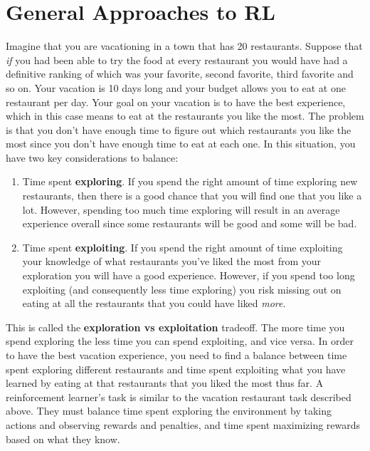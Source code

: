 \section{General Approaches to RL}
Imagine that you are vacationing in a town that has 20 restaurants. Suppose that \textit{if} you had been able to try the food at every restaurant you would have had a definitive ranking of which was your favorite, second favorite, third favorite and so on. Your vacation is 10 days long and your budget allows you to eat at one restaurant per day. Your goal on your vacation is to have the best experience, which in this case means to eat at the restaurants you like the most. The problem is that you don't have enough time to figure out which restaurants you like the most since you don't have enough time to eat at each one. In this situation, you have two key considerations to balance:
\begin{enumerate}
    \item Time spent \textbf{exploring}. If you spend the right amount of time exploring new restaurants, then there is a good chance that you will find one that you like a lot. However, spending too much time exploring will result in an average experience overall since some restaurants will be good and some will be bad.
    \item Time spent \textbf{exploiting}. If you spend the right amount of time exploiting your knowledge of what restaurants you've liked the most from your exploration you will have a good experience. However, if you spend too long exploiting (and consequently less time exploring) you risk missing out on eating at all the restaurants that you could have liked \textit{more}.
\end{enumerate}
This is called the \textbf{exploration vs exploitation} tradeoff. The more time you spend exploring the less time you can spend exploiting, and vice versa. In order to have the best vacation experience, you need to find a balance between time spent exploring different restaurants and time spent exploiting what you have learned by eating at that restaurants that you liked the most thus far. A reinforcement learner's task is similar to the vacation restaurant task described above. They must balance time spent exploring the environment by taking actions and observing rewards and penalties, and time spent maximizing rewards based on what they know.\\

